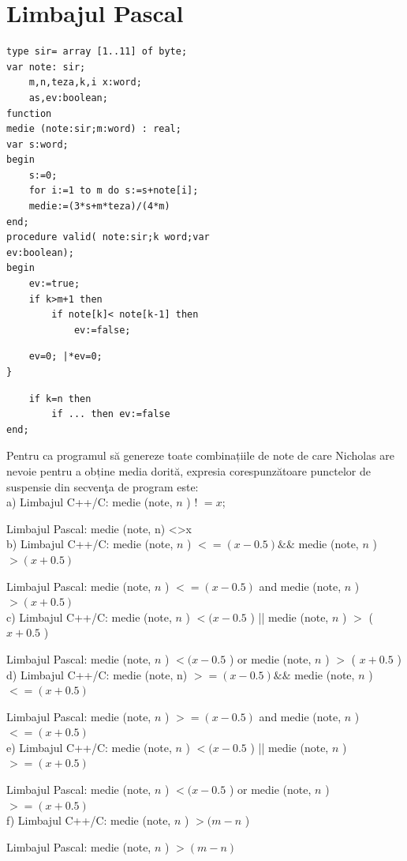 \documentclass[10pt]{article}
\begin{document}
\section*{Limbajul Pascal}
\begin{verbatim}
type sir= array [1..11] of byte;
var note: sir;
    m,n,teza,k,i x:word;
    as,ev:boolean;
function
medie (note:sir;m:word) : real;
var s:word;
begin
    s:=0;
    for i:=1 to m do s:=s+note[i];
    medie:=(3*s+m*teza)/(4*m)
end;
procedure valid( note:sir;k word;var
ev:boolean);
begin
    ev:=true;
    if k>m+1 then
        if note[k]< note[k-1] then
            ev:=false;
\end{verbatim}

\begin{verbatim}
    ev=0; |*ev=0;
}
\end{verbatim}

\begin{verbatim}
    if k=n then
        if ... then ev:=false
end;
\end{verbatim}

Pentru ca programul să genereze toate combinațiile de note de care Nicholas are nevoie pentru a obține media dorită, expresia corespunzătoare punctelor de suspensie din secvenţa de program este:\\
a) Limbajul C++/C: medie (note, $n$ ) ! $=x$;

Limbajul Pascal: medie (note, n) <>x\\
b) Limbajul C++/C: medie (note, $n$ ) $<=(x-0.5) \& \&$ medie (note, $n$ ) $>(x+0.5)$

Limbajul Pascal: medie (note, $n$ ) $<=(x-0.5)$ and medie (note, $n$ ) $>(x+0.5)$\\
c) Limbajul C++/C: medie (note, $n$ ) $<(x-0.5$ ) || medie (note, $n$ ) $>$ ( $x+0.5$ )

Limbajul Pascal: medie (note, $n$ ) $<(x-0.5$ ) or medie (note, $n$ ) $>$ ( $x+0.5$ )\\
d) Limbajul C++/C: medie (note, n) $>=(x-0.5) \& \&$ medie (note, $n$ ) $<=(x+0.5)$

Limbajul Pascal: medie (note, $n$ ) $>=(x-0.5)$ and medie (note, $n$ ) $<=(x+0.5)$\\
e) Limbajul C++/C: medie (note, $n$ ) $<(x-0.5$ ) || medie (note, $n$ ) $>=(x+0.5)$

Limbajul Pascal: medie (note, $n$ ) $<(x-0.5$ ) or medie (note, $n$ ) $>=(x+0.5)$\\
f) Limbajul C++/C: medie (note, $n$ ) $>(m-n$ )

Limbajul Pascal: medie (note, $n$ ) $>(m-n)$
\end{document}
